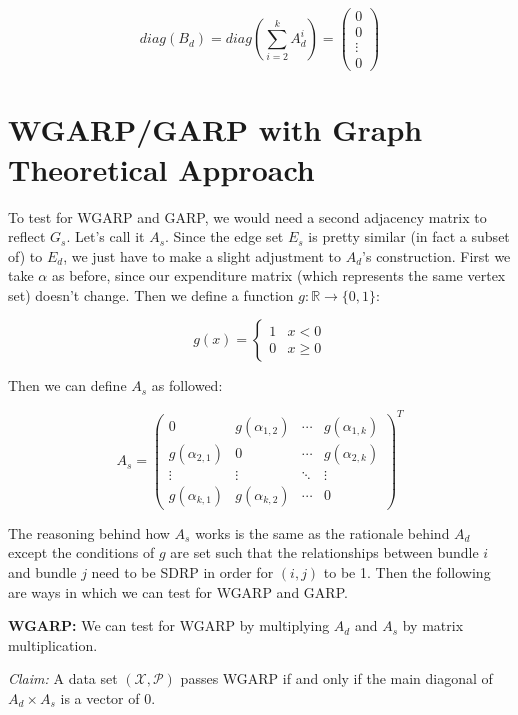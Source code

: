 \documentclass{article} %
\begin{document}
\[
diag(B_d) = diag(\sum_{i=2}^{k}A_d^i)=
 \begin{pmatrix}
  0 \\
  0 \\
  \vdots \\
  0
 \end{pmatrix}
\]

\section{WGARP/GARP with Graph Theoretical Approach}

To test for WGARP and GARP, we would need a second adjacency matrix to reflect $G_s$. Let's call it $A_s$. Since the edge set $E_s$ is pretty similar (in fact a subset of) to $E_d$, we just have to make a slight adjustment to $A_d$'s construction. First we take $\alpha$ as before, since our expenditure matrix (which represents the same vertex set) doesn't change. Then we define a function $g:\mathbb{R}\to\{0,1\}$:

\[ 
g(x)=
    \begin{cases} 
      1 & x<0 \\
      0 & x\geq0
   \end{cases}
\]

Then we can define $A_s$ as followed:

\[
A_s =
 \begin{pmatrix}
  0 & g(\alpha_{1,2}) & \cdots & g(\alpha_{1,k}) \\
  g(\alpha_{2,1}) & 0 & \cdots & g(\alpha_{2,k}) \\
  \vdots  & \vdots  & \ddots & \vdots  \\
  g(\alpha_{k,1}) & g(\alpha_{k,2}) & \cdots & 0
 \end{pmatrix} ^T
\]

The reasoning behind how $A_s$ works is the same as the rationale behind $A_d$ except the conditions of $g$ are set such that the relationships between bundle $i$ and bundle $j$ need to be SDRP in order for $(i,j)$ to be 1. Then the following are ways in which we can test for WGARP and GARP.


\textbf{WGARP:} We can test for WGARP by multiplying $A_d$ and $A_s$ by matrix multiplication.


\textit{Claim:} A data set $(\mathcal{X}, \mathcal{P})$ passes WGARP if and only if the main diagonal of $A_d\times A_s$ is a vector of 0.
\end{document}
